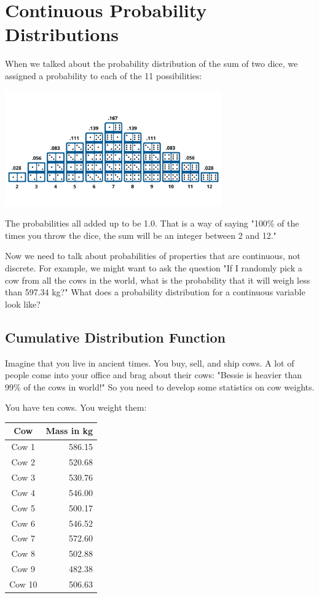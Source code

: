 \chapter{Continuous Probability Distributions}

When we talked about the probability distribution of the sum of two dice,  we assigned a probability to each of the 11 possibilities:

\includegraphics[width=0.7\textwidth]{dice_histogram.png}

The probabilities all added up to be 1.0.  That is a way of saying "100\% of the times you throw the dice,  the sum will be an integer between 2 and 12."

Now we need to talk about probabilities of properties that are continuous,  not discrete.   For example, we might want to ask the question "If I randomly pick a cow from all the cows in the 
world, what is the probability that it will weigh less than 597.34 kg?"  What does a probability distribution for a continuous variable look like?

\section{Cumulative Distribution Function}

Imagine that you live in ancient times.  You buy, sell, and ship cows.   A lot of people come into your office and brag about their cows: "Bessie is heavier than 99\% of the cows in 
world!"  So you need to develop some statistics on cow weights.

You have ten cows.  You weight them:

\begin{tabular}{c|r}
Cow & Mass in kg \\
\hline
Cow 1 & 586.15 \\
Cow 2 & 520.68 \\
Cow 3 & 530.76 \\
Cow 4 & 546.00 \\
Cow 5 & 500.17 \\
Cow 6 & 546.52 \\
Cow 7 & 572.60 \\
Cow 8 & 502.88 \\
Cow 9 & 482.38 \\
Cow 10 & 506.63 \\
\end{tabular}


